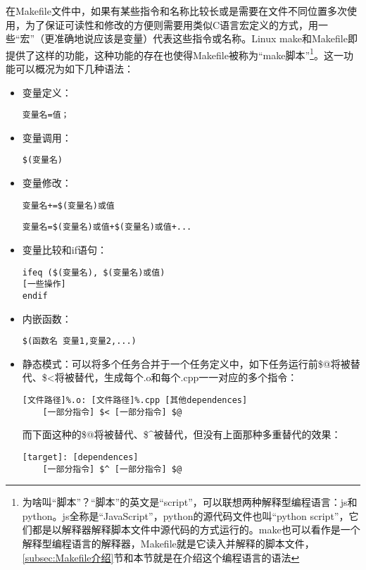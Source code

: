 在Makefile文件中，如果有某些指令和名称比较长或是需要在文件不同位置多次使用，为了保证可读性和修改的方便则需要用类似C语言宏定义的方式，用一些“宏”（更准确地说应该是变量）代表这些指令或名称。Linux make和Makefile即提供了这样的功能，这种功能的存在也使得Makefile被称为“make脚本”\footnote{为啥叫“脚本”？“脚本”的英文是“script”，可以联想两种解释型编程语言：js和python。js全称是“JavaScript”，python的源代码文件也叫“python script”，它们都是以解释器解释脚本文件中源代码的方式运行的。make也可以看作是一个解释型编程语言的解释器，Makefile就是它读入并解释的脚本文件，\ref{subsec:Makefile介绍}节和本节就是在介绍这个编程语言的语法}。这一功能可以概况为如下几种语法：
\begin{itemize}
	\item 变量定义：
	      \begin{lstlisting}
变量名=值；
    \end{lstlisting}
	\item 变量调用：
	      \begin{lstlisting}
$(变量名)
    \end{lstlisting}
	\item 变量修改：
	      \begin{lstlisting}
变量名+=$(变量名)或值
    \end{lstlisting}
	      \begin{lstlisting}
变量名=$(变量名)或值+$(变量名)或值+...
    \end{lstlisting}
	\item 变量比较和if语句：
	      \begin{lstlisting}
ifeq ($(变量名), $(变量名)或值)
[一些操作]
endif
    \end{lstlisting}
	\item 内嵌函数：
	      \begin{lstlisting}
$(函数名 变量1,变量2,...)
    \end{lstlisting}
	\item 静态模式：可以将多个任务合并于一个任务定义中，如下任务运行前{\codefont\$@}将被替代、{\codefont\$<}将被替代，生成每个.o和每个.cpp一一对应的多个指令：
	      \begin{lstlisting}
[文件路径]%.o: [文件路径]%.cpp [其他dependences]
    [一部分指令] $< [一部分指令] $@
    \end{lstlisting}
	      而下面这种的{\codefont\$@}将被替代、{\codefont\$\^{}}被替代，但没有上面那种多重替代的效果：
	      \begin{lstlisting}
[target]: [dependences]
    [一部分指令] $^ [一部分指令] $@
    \end{lstlisting}
\end{itemize}

